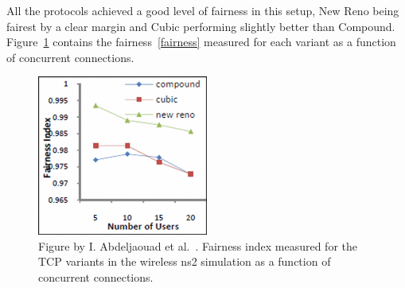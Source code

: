 All the protocols achieved a good level of fairness in this setup, New Reno being fairest by a clear margin and Cubic performing slightly better than Compound. Figure~\ref{fig:fairness2} contains the fairness~\eqref{fairness} measured for each variant as a function of concurrent connections.

\begin{figure}
	\includegraphics[width=0.5\textwidth]{images/abdeljaouad10_fairness_2.png}
	\caption{Figure by I. Abdeljaouad et al.~\cite{Abdeljaouad10}. Fairness index measured for the TCP variants in the wireless ns2 simulation as a function of concurrent connections.}
	\label{fig:fairness2}
\end{figure}